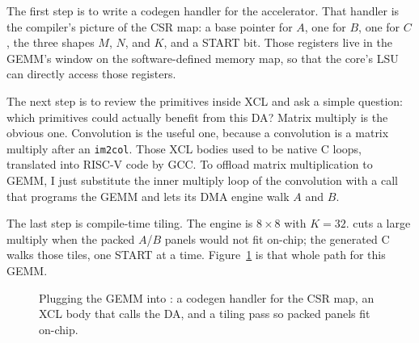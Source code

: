 The first step is to write a codegen handler for the accelerator.
That handler is the compiler's picture of the {CSR} map: a base pointer
for $A$, one for $B$, one for $C$, the three shapes $M$, $N$, and $K$,
and a {START} bit.
Those registers live in the {GEMM}'s window on the software-defined
memory map, so that the core's LSU can directly access those registers.

The next step is to review the primitives inside {XCL} and ask a simple question: which primitives
could actually benefit from this {DA}?
Matrix multiply is the obvious one.
Convolution is the useful one, because a convolution is a matrix
multiply after an \texttt{im2col}.
Those {XCL} bodies used to be native {C} loops, translated into RISC-V code by GCC.
To offload matrix multiplication to {GEMM}, I just substitute the inner multiply loop of the convolution
with a call that programs the {GEMM} and lets its {DMA} engine walk $A$ and $B$.

The last step is compile-time tiling.
The engine is $8{\times}8$ with $K{=}32$.
\pyv{} cuts a large multiply when the packed $A$/$B$ panels would
not fit on-chip; the generated {C} walks those tiles, one {START}
at a time.
Figure~\ref{fig:pyvedas-gemm-plug} is that whole path for this {GEMM}.

\begin{figure}[H]
  \centering
  
  \caption{Plugging the {GEMM} into \pyv{}: a codegen handler for the
    {CSR} map, an {XCL} body that calls the {DA}, and a tiling pass
    so packed panels fit on-chip.}
  \label{fig:pyvedas-gemm-plug}
\end{figure}
